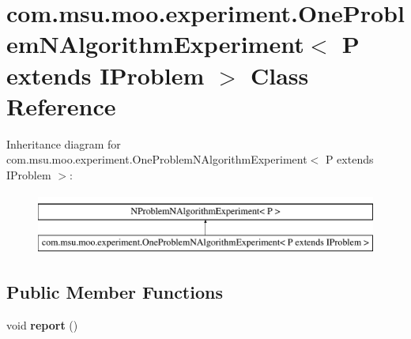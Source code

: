 \hypertarget{classcom_1_1msu_1_1moo_1_1experiment_1_1OneProblemNAlgorithmExperiment_3_01P_01extends_01IProblem_01_4}{\section{com.\-msu.\-moo.\-experiment.\-One\-Problem\-N\-Algorithm\-Experiment$<$ P extends I\-Problem $>$ Class Reference}
\label{classcom_1_1msu_1_1moo_1_1experiment_1_1OneProblemNAlgorithmExperiment_3_01P_01extends_01IProblem_01_4}
}
Inheritance diagram for com.\-msu.\-moo.\-experiment.\-One\-Problem\-N\-Algorithm\-Experiment$<$ P extends I\-Problem $>$\-:\begin{figure}[H]
\begin{center}
\leavevmode
\includegraphics[height=2.000000cm]{classcom_1_1msu_1_1moo_1_1experiment_1_1OneProblemNAlgorithmExperiment_3_01P_01extends_01IProblem_01_4}
\end{center}
\end{figure}
\subsection*{Public Member Functions}
\begin{DoxyCompactItemize}
\item 
\hypertarget{classcom_1_1msu_1_1moo_1_1experiment_1_1OneProblemNAlgorithmExperiment_3_01P_01extends_01IProblem_01_4_ab0cb3c2001b86806de15944bdc796b48}{void {\bfseries report} ()}\label{classcom_1_1msu_1_1moo_1_1experiment_1_1OneProblemNAlgorithmExperiment_3_01P_01extends_01IProblem_01_4_ab0cb3c2001b86806de15944bdc796b48}

\end{DoxyCompactItemize}
